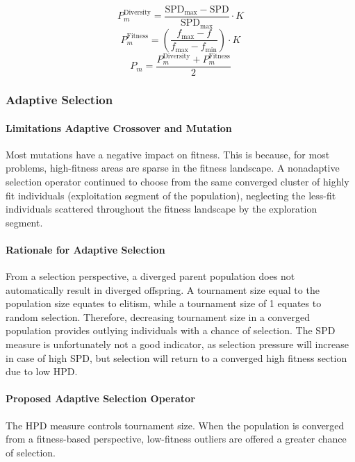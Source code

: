\documentclass[../main.tex]{subfiles}
\begin{document}
\begin{equation}
P_m^{\text{Diversity}} = \frac{\text{SPD}_\text{max} - \text{SPD}}{\text{SPD}_\text{max}} \cdot K
\end{equation}
\begin{equation}
P_m^{\text{Fitness}} = \left( \frac{f_{\text{max}} - f}{f_{\text{max}} - f_{\text{min}}} \right) \cdot K
\end{equation}
\begin{equation}
	P_m = \frac{P_m^{\text{Diversity}}  + P_m^{\text{Fitness}}}{2}
\end{equation}

\subsubsection{Adaptive Selection}

\paragraph{Limitations Adaptive Crossover and Mutation} Most mutations have a negative impact on fitness. This is
because, for most problems, high-fitness areas are sparse in the fitness landscape. A nonadaptive selection operator
continued to choose from the same converged cluster of highly fit individuals (exploitation segment of the population),
neglecting the less-fit individuals scattered throughout the fitness landscape by the exploration segment.

\paragraph{Rationale for Adaptive Selection} From a selection perspective, a diverged parent population does not
automatically result in diverged offspring.  A tournament size equal to the population size equates to elitism, while a
tournament size of 1 equates to random selection. Therefore, decreasing tournament size in a converged population
provides outlying individuals with a chance of selection. The SPD measure is unfortunately not a good indicator, as selection pressure will increase in case of high SPD, but selection will return to a converged high fitness section due to low HPD.

\paragraph{Proposed Adaptive Selection Operator} The HPD measure controls tournament size. When the population is
converged from a fitness-based perspective, low-fitness outliers are offered a greater chance of selection.
\end{document}
